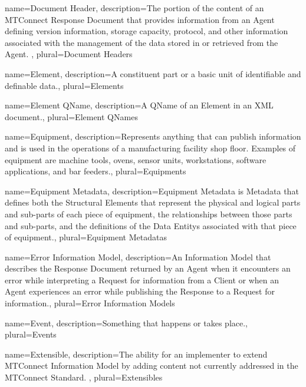 {
    name={Document Header},
	description={The portion of the content of an \gls{MTConnect Response Document} that provides information from an \gls{Agent} defining version information, storage capacity, protocol, and other information associated with the management of the data stored in or retrieved from the \gls{Agent}.
},
	plural={Document Headers}
}

{
    name={Element},
	description={A constituent part or a basic unit of identifiable and definable data.},
	plural={Elements}
}

{
    name={Element QName},
	description={A \gls{QName} of an \gls{Element} in an XML document.},
	plural={Element QNames}
}

{
    name={Equipment},
	description={Represents anything that can publish information and is used in the operations of a manufacturing facility shop floor.  Examples of equipment are machine tools, ovens, sensor units, workstations, software applications, and bar feeders.},
	plural={Equipments}
}

{
    name={Equipment Metadata},
	description={\gls{Equipment Metadata} is {{Metadata}} that defines both the \glspl{Structural Element} that represent the physical and logical parts and sub-parts of each piece of equipment, the relationships between those parts and sub-parts, and the definitions of the \glspl{Data Entity} associated with that piece of equipment.},
	plural={Equipment Metadatas}
}

{
    name={Error Information Model},
	description={An \gls{Information Model} that describes the \gls{Response Document} returned by an \gls{Agent} when it encounters an error while interpreting a \gls{Request} for information from a \gls{Client} or when an \gls{Agent} experiences an error while publishing the \gls{Response} to a \gls{Request} for information.},
	plural={Error Information Models}
}

{
    name={Event},
	description={Something that happens or takes place.},
	plural={Events}
}

{
    name={Extensible},
	description={The ability for an implementer to extend \gls{MTConnect Information Model} by adding content not currently addressed in the MTConnect Standard.
},
	plural={Extensibles}
}

